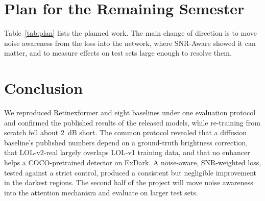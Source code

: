 \documentclass[journal]{IEEEtran}
\begin{document}
\section{Plan for the Remaining Semester}\label{sec:plan}
Table~\ref{tab:plan} lists the planned work. The main change of direction is to move noise awareness from the loss into
the network, where SNR-Aware showed it can matter, and to measure effects on test sets large enough to resolve them.


\section{Conclusion}\label{sec:conclusion}
We reproduced Retinexformer and eight baselines under one evaluation protocol and confirmed the published results of the
released models, while re-training from scratch fell about 2~dB short. The common protocol revealed that a diffusion
baseline's published numbers depend on a ground-truth brightness correction, that LOL-v2-real largely overlaps LOL-v1
training data, and that no enhancer helps a COCO-pretrained detector on ExDark. A noise-aware, SNR-weighted loss,
tested against a strict control, produced a consistent but negligible improvement in the darkest regions. The second
half of the project will move noise awareness into the attention mechanism and evaluate on larger test sets.

\FloatBarrier


\end{document}

